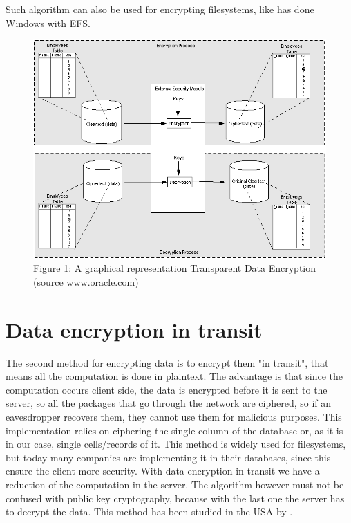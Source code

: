 Such algorithm can also be used for encrypting filesystems, like has done Windows with EFS\cite{efs}.\\
\begin{figure}[]
	\centering
	\includegraphics[scale=0.55]{transdata.png}
	\\Figure 1: A graphical representation Transparent Data Encryption (source www.oracle.com)
\end{figure}
\newpage


\section{Data encryption in transit}
The second method for encrypting data is to encrypt them "in transit", that means all the computation is done in plaintext. The advantage is that since the computation occurs client side, the data is encrypted before it is sent to the server, so all the packages that go through the network are ciphered, so if an eavesdropper recovers them, they cannot use them for malicious purposes.
This implementation relies on ciphering the single column of the database or, as it is in our case, single cells/records of it.
This method is widely used for filesystems, but today many companies are implementing it in their databases, since this ensure the client more security.
With data encryption in transit we have a reduction of the computation in the server.
The algorithm however must not be confused with public key cryptography, because with the last one the server has to decrypt the data. 
This method has been studied in the USA by \cite{cina}.


